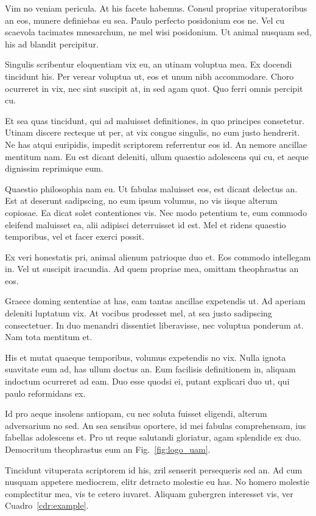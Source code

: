 Vim no veniam pericula. At his facete habemus. Consul propriae vituperatoribus an eos, munere definiebas eu sea. Paulo perfecto posidonium eos ne. Vel cu scaevola tacimates mnesarchum, ne mel wisi posidonium. Ut animal nusquam sed, his ad blandit percipitur.

Singulis scribentur eloquentiam vix eu, an utinam voluptua mea. Ex docendi tincidunt his. Per verear voluptua ut, eos et unum nibh accommodare. Choro ocurreret in vix, nec sint suscipit at, in sed agam quot. Quo ferri omnis percipit cu.

Et sea quas tincidunt, qui ad maluisset definitiones, in quo principes consetetur. Utinam discere recteque ut per, at vix congue singulis, no eum justo hendrerit. Ne has atqui euripidis, impedit scriptorem referrentur eos id. An nemore ancillae mentitum nam. Eu est dicant deleniti, ullum quaestio adolescens qui cu, et aeque dignissim reprimique eum.

Quaestio philosophia nam eu. Ut fabulas maluisset eos, est dicant delectus an. Est at deserunt sadipscing, no eum ipsum volumus, no vis iisque alterum copiosae. Ea dicat solet contentiones vis. Nec modo petentium te, eum commodo eleifend maluisset ea, alii adipisci deterruisset id est. Mel et ridens quaestio temporibus, vel et facer exerci possit.

Ex veri honestatis pri, animal alienum patrioque duo et. Eos commodo intellegam in. Vel ut suscipit iracundia. Ad quem propriae mea, omittam theophrastus an eos.

Graece doming sententiae at has, eam tantas ancillae expetendis ut. Ad aperiam deleniti luptatum vix. At vocibus prodesset mel, at sea justo sadipscing consectetuer. In duo menandri dissentiet liberavisse, nec voluptua ponderum at. Nam tota mentitum et.

His et mutat quaeque temporibus, volumus expetendis no vix. Nulla ignota suavitate eum ad, has ullum doctus an. Eum facilisis definitionem in, aliquam indoctum ocurreret ad eam. Duo esse quodsi ei, putant explicari duo ut, qui paulo reformidans ex. 

Id pro aeque insolens antiopam, cu nec soluta fuisset eligendi, alterum adversarium no sed. An sea sensibus oportere, id mei fabulas comprehensam, ius fabellas adolescens et. Pro ut reque salutandi gloriatur, agam splendide ex duo. Democritum theophrastus eum an Fig.~\ref{fig:logo_uam}.

Tincidunt vituperata scriptorem id his, zril senserit persequeris sed an. Ad cum nusquam appetere mediocrem, elitr detracto molestie eu has. No homero molestie complectitur mea, vis te cetero iuvaret. Aliquam gubergren interesset vis, ver Cuadro~\ref{cdr:example}.


